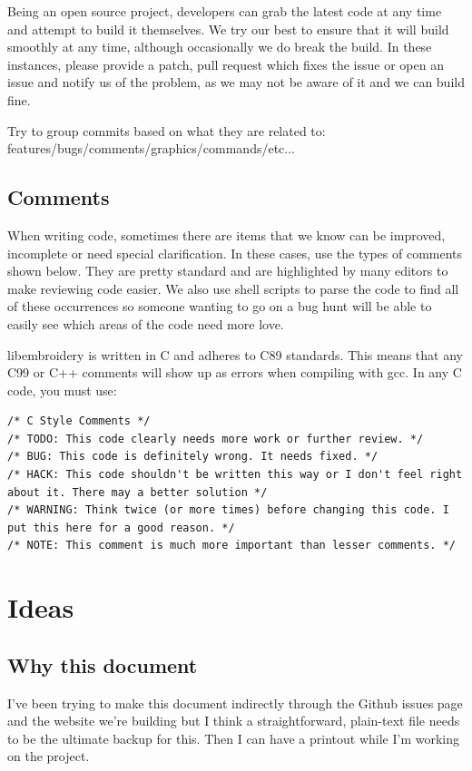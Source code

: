 \documentclass[11pt]{report}
\begin{document}
Being an open source project, developers can grab the latest code at any
time and attempt to build it themselves. We try our best to ensure that
it will build smoothly at any time, although occasionally we do break
the build. In these instances, please provide a patch, pull request
which fixes the issue or open an issue and notify us of the problem, as
we may not be aware of it and we can build fine.

Try to group commits based on what they are related to:
features/bugs/comments/graphics/commands/etc...

\subsection{Comments}

When writing code, sometimes there are items that we know can be
improved, incomplete or need special clarification. In these cases, use
the types of comments shown below. They are pretty standard and are
highlighted by many editors to make reviewing code easier. We also use
shell scripts to parse the code to find all of these occurrences so
someone wanting to go on a bug hunt will be able to easily see which
areas of the code need more love.

libembroidery is written in C and adheres to C89 standards. This means
that any C99 or C++ comments will show up as errors when compiling with
gcc. In any C code, you must use:

\begin{lstlisting}
/* C Style Comments */
/* TODO: This code clearly needs more work or further review. */
/* BUG: This code is definitely wrong. It needs fixed. */
/* HACK: This code shouldn't be written this way or I don't feel right about it. There may a better solution */
/* WARNING: Think twice (or more times) before changing this code. I put this here for a good reason. */
/* NOTE: This comment is much more important than lesser comments. */
\end{lstlisting}

\section{Ideas}

\subsection{Why this document}

I've been trying to make this document indirectly through the Github
issues page and the website we're building but I think a
straightforward, plain-text file needs to be the ultimate backup for
this. Then I can have a printout while I'm working on the project.
\end{document}
